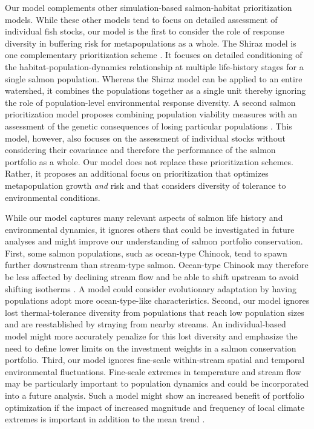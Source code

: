 Our model complements other simulation-based salmon-habitat prioritization models. While these other models tend to focus on detailed assessment of individual fish stocks, our model is the first to consider the role of response diversity in buffering risk for metapopulations as a whole. The Shiraz model is one complementary prioritization scheme \citep{scheuerell2006}. It focuses on detailed conditioning of the habitat-population-dynamics relationship at multiple life-history stages for a single salmon population. Whereas the Shiraz model can be applied to an entire watershed, it combines the populations together as a single unit thereby ignoring the role of population-level environmental response diversity. A second salmon prioritization model proposes combining population viability measures with an assessment of the genetic consequences of losing particular populations \citep{allendorf1997}. This model, however, also focuses on the assessment of individual stocks without considering their covariance and therefore the performance of the salmon portfolio as a whole. Our model does not replace these prioritization schemes. Rather, it proposes an additional focus on prioritization that optimizes metapopulation growth \emph{and} risk and that considers diversity of tolerance to environmental conditions.

While our model captures many relevant aspects of salmon life history and environmental dynamics, it ignores others that could be investigated in future analyses and might improve our understanding of salmon portfolio conservation. First, some salmon populations, such as ocean-type Chinook, tend to spawn further downstream than stream-type salmon. Ocean-type Chinook may therefore be less affected by declining stream flow and be able to shift upstream to avoid shifting isotherms \citep{mantua2010}. A model could consider evolutionary adaptation by having populations adopt more ocean-type-like characteristics. Second, our model ignores lost thermal-tolerance diversity from populations that reach low population sizes and are reestablished by straying from nearby streams. An individual-based model might more accurately penalize for this lost diversity and emphasize the need to define lower limits on the investment weights in a salmon conservation portfolio. Third, our model ignores fine-scale within-stream spatial and temporal environmental fluctuations. Fine-scale extremes in temperature and stream flow may be particularly important to population dynamics \citep{mantua2010} and could be incorporated into a future analysis. Such a model might show an increased benefit of portfolio optimization if the impact of increased magnitude and frequency of local climate extremes is important in addition to the mean trend \citep{jentsch2007}.

